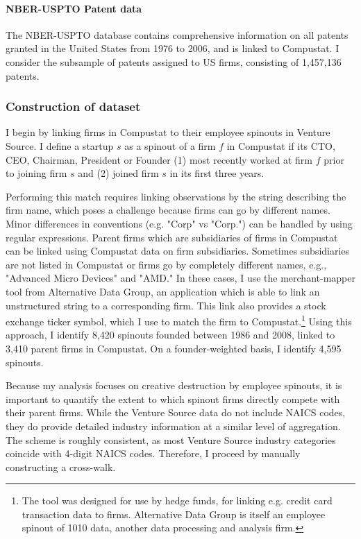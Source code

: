\documentclass[12pt,english]{article}
\theoremstyle{remark}
\begin{document}
\paragraph{NBER-USPTO Patent data}

The NBER-USPTO database contains comprehensive information on all patents granted in the United States from 1976 to 2006, and is linked to Compustat. I consider the subsample of patents assigned to US firms, consisting of 1,457,136 patents. 

\subsubsection{Construction of dataset}

I begin by linking firms in Compustat to their employee spinouts in Venture Source. I define a startup $s$ as a spinout of a firm $f$ in Compustat if its CTO, CEO, Chairman, President or Founder (1) most recently worked at firm $f$ prior to joining firm $s$ and (2) joined firm $s$ in its first three years.

Performing this match requires linking observations by the string describing the firm name, which poses a challenge because firms can go by different names. Minor differences in conventions (e.g. "Corp" vs "Corp.") can be handled by using regular expressions. Parent firms which are subsidiaries of firms in Compustat can be linked using Compustat data on firm subsidiaries. Sometimes subsidiaries are not listed in Compustat or firms go by completely different names, e.g., "Advanced Micro Devices" and "AMD."  In these cases, I use the merchant-mapper tool from Alternative Data Group, an application which is able to link an unstructured string to a corresponding firm. This link also provides a stock exchange ticker symbol, which I use to match the firm to Compustat.\footnote{The tool was designed for use by hedge funds, for linking e.g. credit card transaction data to firms. Alternative Data Group is itself an employee spinout of 1010 data, another data processing and analysis firm.} Using this approach, I identify 8,420 spinouts founded between 1986 and 2008, linked to 3,410 parent firms in Compustat. On a founder-weighted basis, I identify 4,595 spinouts.

Because my analysis focuses on creative destruction by employee spinouts, it is important to quantify the extent to which spinout firms directly compete with their parent firms. While the Venture Source data do not include NAICS codes, they do provide detailed industry information at a similar level of aggregation. The scheme is roughly consistent, as most Venture Source industry categories coincide with 4-digit NAICS codes. Therefore, I proceed by manually constructing a cross-walk.
\end{document}

